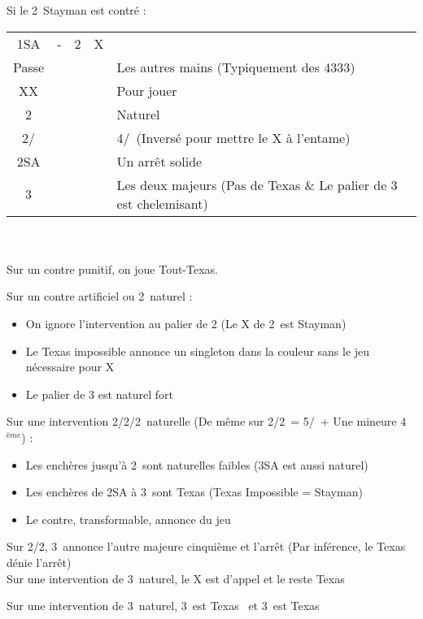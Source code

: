 \documentclass[a4paper, oneside, 11pt]{report}
\begin{document}
		Si le 2\trefle\ Stayman est contré :\\
		\begin{tabular}{cccc|l}
		1SA & - & 2\trefle & X &\\
		Passe &&&& Les autres mains (Typiquement des 4333)\\
		XX &&&& Pour jouer\\
		2\carreau &&&& Naturel\\
		2\coeur/\pique &&&& 4\pique/\coeur\ (Inversé pour mettre le X à l'entame)\\
		2SA &&&& Un arrêt solide\\
		3\trefle &&&& Les deux majeurs (Pas de Texas \& Le palier de 3 est chelemisant)\\
		\end{tabular}\\\\
		
		
		Sur un contre punitif, on joue Tout-Texas.
	
		Sur un contre artificiel ou 2\trefle\ naturel :
		\begin{itemize}
		\item On ignore l'intervention au palier de 2 (Le X de 2\trefle\ est Stayman)
		\item Le Texas impossible annonce un singleton dans la couleur sans le jeu nécessaire pour X
		\item Le palier de 3 est naturel fort\\
		\end{itemize}
		
		Sur une intervention 2\carreau/2\coeur/2\pique\ naturelle (De même sur 2\coeur/2\pique\ = 5\coeur/\pique\ + Une mineure 4$^{ème}$) :
		\begin{itemize}
		\item Les enchères jusqu'à 2\pique\ sont naturelles faibles (3SA est aussi naturel)
		\item Les enchères de 2SA à 3\coeur\ sont Texas (Texas Impossible = Stayman)
		\item Le contre, transformable, annonce du jeu
		\end{itemize}
		Sur 2\coeur/2\pique, 3\pique\ annonce l'autre majeure cinquième et l'arrêt (Par inférence, le Texas dénie l'arrêt)\\
		
		Sur une intervention de 3\trefle\ naturel, le X est d'appel et le reste Texas
		
		Sur une intervention de 3\carreau\ naturel, 3\coeur\ est Texas \pique\ et 3\pique\ est Texas \coeur\\
		
\end{document}
